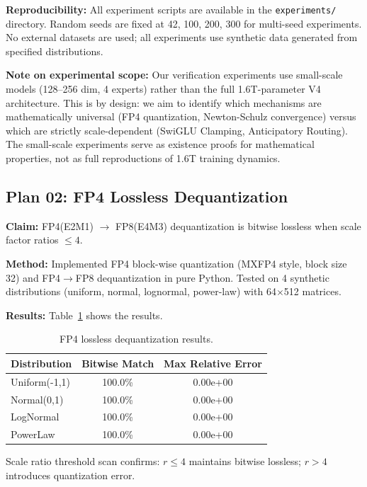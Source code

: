 \documentclass[11pt,a4paper]{article}
\begin{document}
\textbf{Reproducibility:} All experiment scripts are available in the \texttt{experiments/} directory. Random seeds are fixed at 42, 100, 200, 300 for multi-seed experiments. No external datasets are used; all experiments use synthetic data generated from specified distributions.

\textbf{Note on experimental scope:} Our verification experiments use small-scale models (128--256 dim, 4 experts) rather than the full 1.6T-parameter V4 architecture. This is by design: we aim to identify which mechanisms are mathematically universal (FP4 quantization, Newton-Schulz convergence) versus which are strictly scale-dependent (SwiGLU Clamping, Anticipatory Routing). The small-scale experiments serve as existence proofs for mathematical properties, not as full reproductions of 1.6T training dynamics.

\subsection{Plan 02: FP4 Lossless Dequantization}

\textbf{Claim:} FP4(E2M1) $\to$ FP8(E4M3) dequantization is bitwise lossless when scale factor ratios $\leq 4$.

\textbf{Method:} Implemented FP4 block-wise quantization (MXFP4 style, block size 32) and FP4$\to$FP8 dequantization in pure Python. Tested on 4 synthetic distributions (uniform, normal, lognormal, power-law) with 64$\times$512 matrices.

\textbf{Results:} Table~\ref{tab:fp4-results} shows the results.

\begin{table}[H]
\centering
\caption{FP4 lossless dequantization results.}
\label{tab:fp4-results}
\begin{tabular}{lcc}
\toprule
\textbf{Distribution} & \textbf{Bitwise Match} & \textbf{Max Relative Error} \\
\midrule
Uniform(-1,1) & 100.0\% & 0.00e+00 \\
Normal(0,1) & 100.0\% & 0.00e+00 \\
LogNormal & 100.0\% & 0.00e+00 \\
PowerLaw & 100.0\% & 0.00e+00 \\
\bottomrule
\end{tabular}
\end{table}

Scale ratio threshold scan confirms: $r \leq 4$ maintains bitwise lossless; $r > 4$ introduces quantization error.
\end{document}
